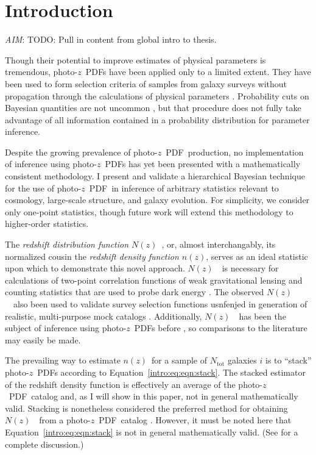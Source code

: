 \documentclass[iop]{emulateapj}
\newcommand{\todo}[3]{{\color{#2}\emph{#1}: #3}}
\newcommand{\aim}[1]{\todo{AIM}{red}{#1}}
\newcommand{\nz}{$n(z)$}
\newcommand{\pz}{photo-$z$~}
\newcommand{\pzpdf}{\pz PDF}
\newcommand{\Nz}{$N(z)$~}
\newcommand{\ntot}{\ensuremath{N_{\mathrm{tot}}}}
\begin{document}
\maketitle

\section{Introduction}
\label{sec:introduction}

\aim{TODO: Pull in content from global intro to thesis.}

Though their potential to improve estimates of physical parameters is 
tremendous, \pzpdf s have been applied only to a limited extent.  
They have been used to form selection criteria of samples from galaxy surveys 
without propagation 
through the calculations of physical parameters 
\citep{VanBreukelen2009,Viironen2015}.  
Probability cuts on Bayesian quantities are not uncommon \citep{Leung2015, 
DiPompeo2015a}, but that procedure does not fully take advantage of all 
information contained in a probability distribution for parameter inference.  

Despite the growing prevalence of \pzpdf\ production, no implementation of 
inference using \pzpdf s has yet been presented with a mathematically 
consistent methodology.  
I present and validate a hierarchical Bayesian technique for the use of \pzpdf\ 
in inference of arbitrary statistics relevant to cosmology, large-scale 
structure, and galaxy evolution.  
For simplicity, we consider only one-point statistics, though future work will 
extend this methodology to higher-order statistics.

The \textit{redshift distribution function \Nz}, or, almost interchangably, its 
normalized cousin the \textit{redshift density function \nz}, serves as an 
ideal statistic upon which to demonstrate this novel approach.  
\Nz\ is necessary for calculations of two-point correlation functions of weak 
gravitational lensing and counting statistics that are used to probe dark 
energy \citep{Masters2015}.  
The observed \Nz\ also been used to validate survey selection functions 
usnfenjed in generation of realistic, multi-purpose mock catalogs 
\citep{Norberg2002}.  
Additionally, \Nz\ has been the subject of inference using \pzpdf s before 
\citep{sheldon_photometric_2012, Hildebrandt2012, Kelly2014, Benjamin2013, 
bonnett_using_2015, Viironen2015, Asorey2016, leistedt_hierarchical_2016}, so 
comparisons to the literature may easily be made. 

The prevailing way to estimate \nz\ for a sample of $\ntot$ galaxies $i$ is to 
``stack'' \pzpdf s according to Equation~\ref{intro:eq:eqn:stack}.
The stacked estimator of the redshift density function is effectively an 
average of the \pzpdf\ catalog and, as I will show in this paper, not in 
general mathematically valid.
Stacking is nonetheless considered the preferred method for obtaining \Nz\ from 
a \pzpdf\ catalog \citep{sheldon_photometric_2012, Kelly2014, Benjamin2013, 
bonnett_using_2015, Viironen2015, Asorey2016}.  
However, it must be noted here that Equation~\ref{intro:eq:eqn:stack} is not in 
general mathematically valid.  
(See \citet{Hogg2012} for a complete discussion.)  
\end{document}
